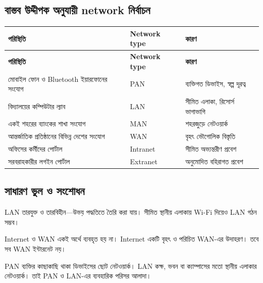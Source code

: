\subsection{বাস্তব উদ্দীপক অনুযায়ী network নির্বাচন}

\begingroup
\begin{longtable}{|p{}|p{}|p{}|}
\hline
\textbf{পরিস্থিতি} & \textbf{Network type} & \textbf{কারণ} \\
\hline
\endfirsthead
\hline
\textbf{পরিস্থিতি} & \textbf{Network type} & \textbf{কারণ} \\
\hline
\endhead

মোবাইল ফোন ও Bluetooth ইয়ারফোনের সংযোগ & PAN & ব্যক্তিগত ডিভাইস, স্বল্প দূরত্ব \\
\hline
বিদ্যালয়ের কম্পিউটার ল্যাব & LAN & সীমিত এলাকা, রিসোর্স ভাগাভাগি \\
\hline
একই শহরের ব্যাংকের শাখা সংযোগ & MAN & শহরজুড়ে নেটওয়ার্ক \\
\hline
আন্তর্জাতিক প্রতিষ্ঠানের বিভিন্ন দেশের সংযোগ & WAN & বৃহৎ ভৌগোলিক বিস্তৃতি \\
\hline
অফিসের কর্মীদের পোর্টাল & Intranet & সীমিত অভ্যন্তরীণ প্রবেশ \\
\hline
সরবরাহকারীর লগইন পোর্টাল & Extranet & অনুমোদিত বহিরাগত প্রবেশ \\
\hline
\end{longtable}
\endgroup




\subsection{সাধারণ ভুল ও সংশোধন}

LAN তারযুক্ত ও তারবিহীন—উভয় পদ্ধতিতে তৈরি করা যায়। সীমিত স্থানীয় এলাকায় Wi-Fi দিয়েও LAN গঠন সম্ভব।

Internet ও WAN একই অর্থে ব্যবহৃত হয় না। Internet একটি বৃহৎ ও পরিচিত WAN-এর উদাহরণ। তবে সব WAN ইন্টারনেট নয়।

PAN ব্যক্তির কাছাকাছি থাকা ডিভাইসের ছোট নেটওয়ার্ক। LAN কক্ষ, ভবন বা ক্যাম্পাসের মতো স্থানীয় এলাকার নেটওয়ার্ক। তাই PAN ও LAN-এর ব্যবহারিক পরিসর আলাদা।

